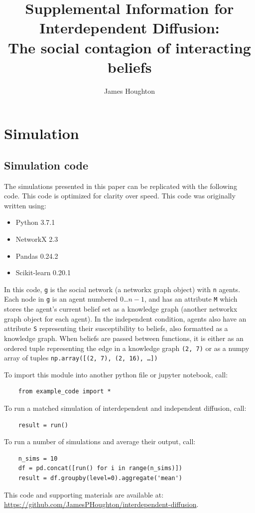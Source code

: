 \documentclass{article}
\title{%
    Supplemental Information for \\ 
    \large Interdependent Diffusion: \\ 
    The social contagion of interacting beliefs
    }
\author{James Houghton}
\begin{document}
\maketitle
\tableofcontents

\section{Simulation}

\subsection{Simulation code}
The simulations presented in this paper can be replicated with the following code. This code is optimized for clarity over speed. This code was originally written using:
\begin{itemize}
  \item Python 3.7.1
  \item NetworkX 2.3
  \item Pandas 0.24.2
  \item Scikit-learn 0.20.1
\end{itemize}

In this code, \texttt{g} is the social network (a networkx graph object) with \texttt{n} agents. Each node in \texttt{g} is an agent numbered $0$\ldots$n-1$, and has an attribute \texttt{M} which stores the agent's current belief set as a knowledge graph (another networkx graph object for each agent). In the independent condition, agents also have an attribute \texttt{S} representing their susceptibility to beliefs, also formatted as a knowledge graph. When beliefs are passed between functions, it is either as an ordered tuple representing the edge in a knowledge graph \texttt{(2, 7)} or as a numpy array of tuples \texttt{np.array([(2, 7), (2, 16), \ldots])}

To import this module into another python file or jupyter notebook, call:
\begin{verbatim}
    from example_code import *
\end{verbatim}
To run a matched simulation of interdependent and independent diffusion, call:
\begin{verbatim}
    result = run()
\end{verbatim}
To run a number of simulations and average their output, call:
\begin{verbatim}
    n_sims = 10
    df = pd.concat([run() for i in range(n_sims)])
    result = df.groupby(level=0).aggregate('mean')
\end{verbatim}    
This code and supporting materials are available at: \url{https://github.com/JamesPHoughton/interdependent-diffusion}.
\end{document}
